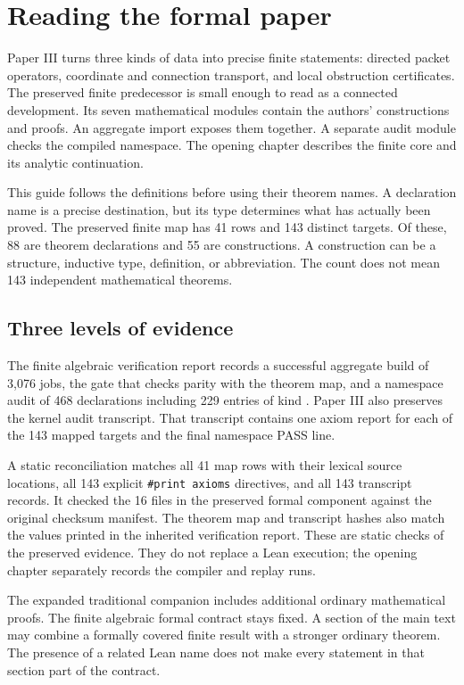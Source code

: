 \section{Reading the formal paper}
Paper III turns three kinds of data into precise finite statements: directed packet operators, coordinate and connection transport, and local obstruction certificates. The preserved finite predecessor is small enough to read as a connected development. Its seven mathematical modules contain the authors' constructions and proofs. An aggregate import exposes them together. A separate audit module checks the compiled namespace. The opening chapter describes the finite core and its analytic continuation.

This guide follows the definitions before using their theorem names. A declaration name is a precise destination, but its type determines what has actually been proved. The preserved finite map has 41 rows and 143 distinct targets. Of these, 88 are theorem declarations and 55 are constructions. A construction can be a structure, inductive type, definition, or abbreviation. The count does not mean 143 independent mathematical theorems.

\subsection{Three levels of evidence}
The finite algebraic verification report records a successful aggregate build of 3,076 jobs, the gate that checks parity with the theorem map, and a namespace audit of 468 declarations including 229 entries of kind . Paper III also preserves the kernel audit transcript. That transcript contains one axiom report for each of the 143 mapped targets and the final namespace PASS line.

A static reconciliation matches all 41 map rows with their lexical source locations, all 143 explicit \texttt{\#print axioms} directives, and all 143 transcript records. It checked the 16 files in the preserved formal component against the original checksum manifest. The theorem map and transcript hashes also match the values printed in the inherited verification report. These are static checks of the preserved evidence. They do not replace a Lean execution; the opening chapter separately records the compiler and replay runs.

The expanded traditional companion includes additional ordinary mathematical proofs. The finite algebraic formal contract stays fixed. A section of the main text may combine a formally covered finite result with a stronger ordinary theorem. The presence of a related Lean name does not make every statement in that section part of the contract.

